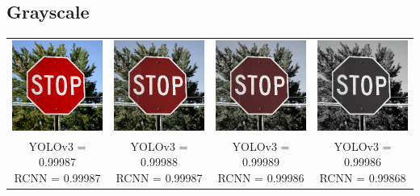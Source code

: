 \documentclass{article}
\begin{document}
\subsection{Grayscale}
\begin{center}
\begin{tabular}{ c c c c }
    \includegraphics[width=0.2\linewidth]{../test_images/stop.png} & \includegraphics[width=0.2\linewidth]{../test_images/perturbed/stop_grayscale_0_500.png} & \includegraphics[width=0.2\linewidth]{../test_images/perturbed/stop_grayscale_0_250.png} & \includegraphics[width=0.2\linewidth]{../test_images/perturbed/stop_grayscale_0_010.png} \\
    \makecell{YOLOv3 = 0.99987 \\ RCNN = 0.99987} & \makecell{YOLOv3 = 0.99988 \\ RCNN = 0.99987} & \makecell{YOLOv3 = 0.99989 \\ RCNN = 0.99986} & \makecell{YOLOv3 = 0.99986 \\ RCNN = 0.99868} \\  
\end{tabular}
\end{center}
\end{document}
